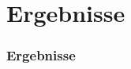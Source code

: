 \footdecorationlow
\section{Ergebnisse}
\begin{frame}[allowframebreaks]
	\thispagestyle{empty}
	\frametitle{Ergebnisse}
	
\end{frame}